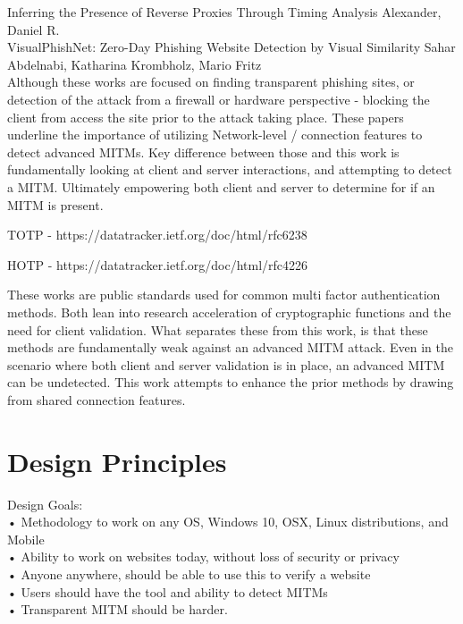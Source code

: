 \documentclass[a4paper, 11pt]{article} 				%
\begin{document}
\noindent
[18]Inferring the Presence of Reverse Proxies Through Timing Analysis
Alexander, Daniel R.\\

\noindent
[19]VisualPhishNet: Zero-Day Phishing Website Detection by Visual Similarity
Sahar Abdelnabi, Katharina Krombholz, Mario Fritz\\

Although these works are focused on finding transparent phishing sites, or detection of the attack from a firewall or hardware perspective - blocking the client from access the site prior to the attack taking place. These papers underline the importance of utilizing Network-level / connection features to detect advanced MITMs. Key difference between those and this work is fundamentally looking at client and server interactions, and attempting to detect a MITM. Ultimately empowering both client and server to determine for if an MITM is present. 

\noindent
[7]TOTP - https://datatracker.ietf.org/doc/html/rfc6238

\noindent
[8]HOTP - https://datatracker.ietf.org/doc/html/rfc4226 

These works are public standards used for common multi factor authentication methods. Both lean into research acceleration of cryptographic functions and the need for client validation. What separates these from this work, is that these methods are fundamentally weak against an advanced MITM attack. Even in the scenario where both client and server validation is in place, an advanced MITM can be undetected. This work attempts to enhance the prior methods by drawing from shared connection features.

\section{Design Principles}
\noindent	%
Design Goals:\\
• Methodology to work on any OS, Windows 10, OSX, Linux distributions, and Mobile\\
• Ability to work on websites today, without loss of security or privacy\\
• Anyone anywhere, should be able to use this to verify a website\\
• Users should have the tool and ability to detect MITMs\\
• Transparent MITM should be harder.\\
\end{document}
